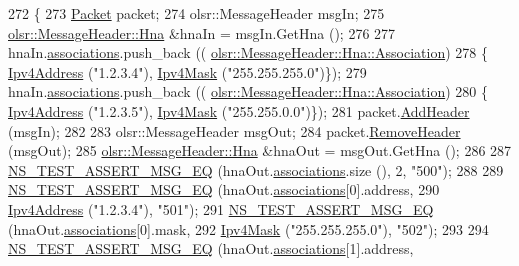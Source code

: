\begin{DoxyCode}
272 \{
273   \hyperlink{classns3_1_1Packet}{Packet} packet;
274   olsr::MessageHeader msgIn;
275   \hyperlink{structns3_1_1olsr_1_1MessageHeader_1_1Hna}{olsr::MessageHeader::Hna} &hnaIn = msgIn.GetHna ();
276 
277   hnaIn.\hyperlink{structns3_1_1olsr_1_1MessageHeader_1_1Hna_a3989e2a5026258e7cbde6d7795aa9c9f}{associations}.push\_back ((
      \hyperlink{structns3_1_1olsr_1_1MessageHeader_1_1Hna_1_1Association}{olsr::MessageHeader::Hna::Association})
278                                 \{ \hyperlink{classns3_1_1Ipv4Address}{Ipv4Address} (\textcolor{stringliteral}{"1.2.3.4"}), \hyperlink{classns3_1_1Ipv4Mask}{Ipv4Mask} (\textcolor{stringliteral}{"255.255.255.0"})\});
279   hnaIn.\hyperlink{structns3_1_1olsr_1_1MessageHeader_1_1Hna_a3989e2a5026258e7cbde6d7795aa9c9f}{associations}.push\_back ((
      \hyperlink{structns3_1_1olsr_1_1MessageHeader_1_1Hna_1_1Association}{olsr::MessageHeader::Hna::Association})
280                                 \{ \hyperlink{classns3_1_1Ipv4Address}{Ipv4Address} (\textcolor{stringliteral}{"1.2.3.5"}), \hyperlink{classns3_1_1Ipv4Mask}{Ipv4Mask} (\textcolor{stringliteral}{"255.255.0.0"})\});
281   packet.\hyperlink{classns3_1_1Packet_a465108c595a0bc592095cbcab1832ed8}{AddHeader} (msgIn);
282 
283   olsr::MessageHeader msgOut;
284   packet.\hyperlink{classns3_1_1Packet_a0961eccf975d75f902d40956c93ba63e}{RemoveHeader} (msgOut);
285   \hyperlink{structns3_1_1olsr_1_1MessageHeader_1_1Hna}{olsr::MessageHeader::Hna} &hnaOut = msgOut.GetHna ();
286 
287   \hyperlink{group__testing_ga2a9d78cffb3db8e867c35fff0b698cf5}{NS\_TEST\_ASSERT\_MSG\_EQ} (hnaOut.\hyperlink{structns3_1_1olsr_1_1MessageHeader_1_1Hna_a3989e2a5026258e7cbde6d7795aa9c9f}{associations}.size (), 2, \textcolor{stringliteral}{"500"});
288 
289   \hyperlink{group__testing_ga2a9d78cffb3db8e867c35fff0b698cf5}{NS\_TEST\_ASSERT\_MSG\_EQ} (hnaOut.\hyperlink{structns3_1_1olsr_1_1MessageHeader_1_1Hna_a3989e2a5026258e7cbde6d7795aa9c9f}{associations}[0].address,
290                          \hyperlink{classns3_1_1Ipv4Address}{Ipv4Address} (\textcolor{stringliteral}{"1.2.3.4"}), \textcolor{stringliteral}{"501"});
291   \hyperlink{group__testing_ga2a9d78cffb3db8e867c35fff0b698cf5}{NS\_TEST\_ASSERT\_MSG\_EQ} (hnaOut.\hyperlink{structns3_1_1olsr_1_1MessageHeader_1_1Hna_a3989e2a5026258e7cbde6d7795aa9c9f}{associations}[0].mask,
292                          \hyperlink{classns3_1_1Ipv4Mask}{Ipv4Mask} (\textcolor{stringliteral}{"255.255.255.0"}), \textcolor{stringliteral}{"502"});
293 
294   \hyperlink{group__testing_ga2a9d78cffb3db8e867c35fff0b698cf5}{NS\_TEST\_ASSERT\_MSG\_EQ} (hnaOut.\hyperlink{structns3_1_1olsr_1_1MessageHeader_1_1Hna_a3989e2a5026258e7cbde6d7795aa9c9f}{associations}[1].address,

\end{DoxyCode}
